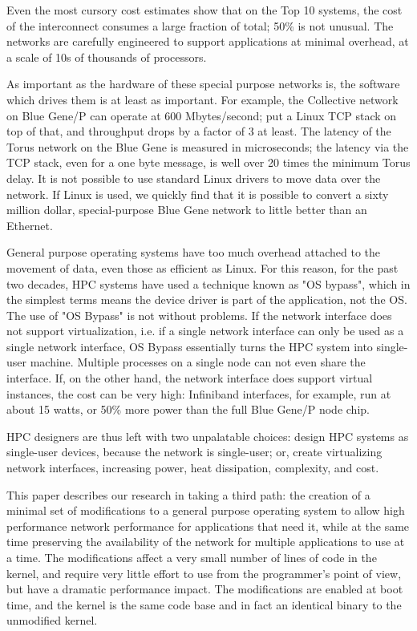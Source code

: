 \documentclass[letterpaper,twocolumn,10pt]{article}
\begin{document}
Even the most cursory cost estimates show that on the Top 10 systems, the cost of the interconnect consumes a large fraction of total; 50\% is not unusual. The networks are carefully engineered to support applications at minimal overhead, at a scale of 10s of thousands of processors. 

As important as the hardware of these special purpose networks is, the software which drives them is at least as important. For example, the Collective network on Blue Gene/P can operate at 600 Mbytes/second; put a Linux TCP stack on top of that, and throughput
drops by a factor of 3 at least. The latency of the Torus network on the Blue Gene is measured in microseconds; the latency via the TCP stack, even for a one byte message, is well over 20 times the minimum Torus delay. It is not possible to use standard Linux drivers to move data over the network. 
If Linux is used, we quickly find that it is possible to convert a sixty million dollar, special-purpose Blue Gene network to little better than an Ethernet. 

General purpose operating systems have too much overhead attached to the movement of data, even those as efficient as Linux. 
For this reason, for the past two decades, HPC systems have used a technique known as "OS bypass", which in the simplest terms means the device driver is part of the application, not the OS. 
The use of "OS Bypass" is not without problems. If the network interface does not support virtualization, i.e. if a single network interface can only be used as a single network interface, OS Bypass essentially turns
the HPC system into single-user machine. Multiple processes on a single node can not even share the interface. If, on the other hand, the network interface does support virtual instances, the cost can be very high: 
Infiniband interfaces, for example, run at about 15 watts, or 50\% more power than the full Blue Gene/P node chip. 

HPC designers are thus left with two unpalatable choices: design HPC systems as single-user devices, because the network is single-user; or, create virtualizing network interfaces, increasing power, heat dissipation, complexity, and cost. 

This paper describes our research in taking a third path: the creation of  a minimal set of modifications to a general purpose operating system to allow high performance network performance for applications that need it, while at the same time preserving the availability of the network for multiple applications to use at a time. The modifications affect a very small number of lines of code in the kernel, and require very little 
effort to use from the programmer's point of view, but have a dramatic 
performance impact. The modifications are enabled at boot time, and the kernel is the same code base and in fact an identical binary to the unmodified kernel. 
\end{document}
